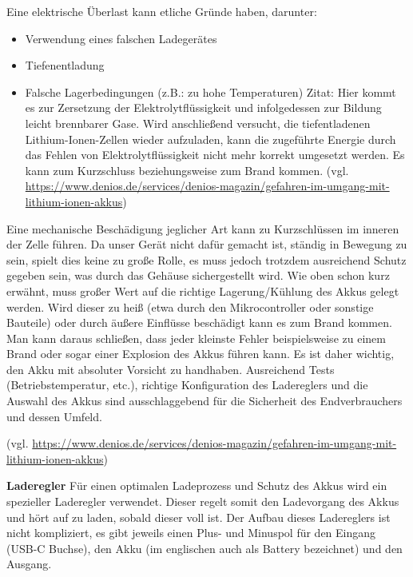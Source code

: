 \documentclass[11pt, twoside]{article}
\begin{document}
Eine elektrische Überlast kann etliche Gründe haben, darunter: 
\begin{itemize}
	\item Verwendung eines falschen Ladegerätes
	\item Tiefenentladung
	\item Falsche Lagerbedingungen (z.B.: zu hohe Temperaturen) 
\newline
Zitat: \glqq Hier kommt es zur Zersetzung der Elektrolytflüssigkeit und infolgedessen zur Bildung leicht brennbarer Gase. Wird anschließend versucht, die tiefentladenen Lithium-Ionen-Zellen wieder aufzuladen, kann die zugeführte Energie durch das Fehlen von Elektrolytflüssigkeit nicht mehr korrekt umgesetzt werden. Es kann zum Kurzschluss beziehungsweise zum Brand kommen.\grqq{} (vgl. \url{https://www.denios.de/services/denios-magazin/gefahren-im-umgang-mit-lithium-ionen-akkus})
\end{itemize}
Eine mechanische Beschädigung jeglicher Art kann zu Kurzschlüssen im inneren der Zelle führen. Da unser Gerät nicht dafür gemacht ist, ständig in Bewegung zu sein, spielt dies keine zu große Rolle, es muss jedoch trotzdem ausreichend Schutz gegeben sein, was durch das Gehäuse sichergestellt wird.
\vspace{4mm}\newline
Wie oben schon kurz erwähnt, muss großer Wert auf die richtige Lagerung/Kühlung des Akkus gelegt werden. Wird dieser zu heiß (etwa durch den Mikrocontroller oder sonstige Bauteile) oder durch äußere Einflüsse beschädigt kann es zum Brand kommen.
\vspace{4mm}\newline
Man kann daraus schließen, dass jeder kleinste Fehler beispielsweise zu einem Brand oder sogar einer Explosion des Akkus führen kann. Es ist daher wichtig, den Akku mit absoluter Vorsicht zu handhaben. Ausreichend Tests (Betriebstemperatur, etc.), richtige Konfiguration des Ladereglers und die Auswahl des Akkus sind ausschlaggebend für die Sicherheit des Endverbrauchers und dessen Umfeld.

(vgl. \url{https://www.denios.de/services/denios-magazin/gefahren-im-umgang-mit-lithium-ionen-akkus})

\textbf{Laderegler}\newline
Für einen optimalen Ladeprozess und Schutz des Akkus wird ein spezieller Laderegler verwendet. Dieser regelt somit den Ladevorgang des Akkus und hört auf zu laden, sobald dieser voll ist. Der Aufbau dieses Ladereglers ist nicht kompliziert, es gibt jeweils einen Plus- und Minuspol für den Eingang (USB-C Buchse), den Akku (im englischen auch als Battery bezeichnet) und den Ausgang.
\end{document}

